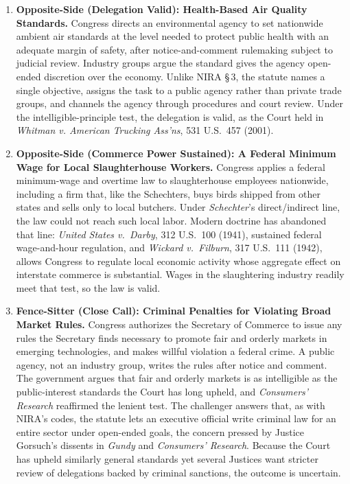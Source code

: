 \documentclass[12pt]{article}
\begin{document}
\begin{enumerate}
\item \textbf{Opposite-Side (Delegation Valid): Health-Based Air Quality Standards.} Congress directs an environmental agency to set nationwide ambient air standards at the level needed to protect public health with an adequate margin of safety, after notice-and-comment rulemaking subject to judicial review. Industry groups argue the standard gives the agency open-ended discretion over the economy. Unlike NIRA \S\,3, the statute names a single objective, assigns the task to a public agency rather than private trade groups, and channels the agency through procedures and court review. Under the intelligible-principle test, the delegation is valid, as the Court held in \textit{Whitman v. American Trucking Ass'ns}, 531 U.S.\ 457 (2001).

\item \textbf{Opposite-Side (Commerce Power Sustained): A Federal Minimum Wage for Local Slaughterhouse Workers.} Congress applies a federal minimum-wage and overtime law to slaughterhouse employees nationwide, including a firm that, like the Schechters, buys birds shipped from other states and sells only to local butchers. Under \textit{Schechter}'s direct/indirect line, the law could not reach such local labor. Modern doctrine has abandoned that line: \textit{United States v.\ Darby}, 312 U.S.\ 100 (1941), sustained federal wage-and-hour regulation, and \textit{Wickard v.\ Filburn}, 317 U.S.\ 111 (1942), allows Congress to regulate local economic activity whose aggregate effect on interstate commerce is substantial. Wages in the slaughtering industry readily meet that test, so the law is valid.

\item \textbf{Fence-Sitter (Close Call): Criminal Penalties for Violating Broad Market Rules.} Congress authorizes the Secretary of Commerce to issue any rules the Secretary finds necessary to promote fair and orderly markets in emerging technologies, and makes willful violation a federal crime. A public agency, not an industry group, writes the rules after notice and comment. The government argues that fair and orderly markets is as intelligible as the public-interest standards the Court has long upheld, and \textit{Consumers' Research} reaffirmed the lenient test. The challenger answers that, as with NIRA's codes, the statute lets an executive official write criminal law for an entire sector under open-ended goals, the concern pressed by Justice Gorsuch's dissents in \textit{Gundy} and \textit{Consumers' Research}. Because the Court has upheld similarly general standards yet several Justices want stricter review of delegations backed by criminal sanctions, the outcome is uncertain.

\end{enumerate}
\end{document}
